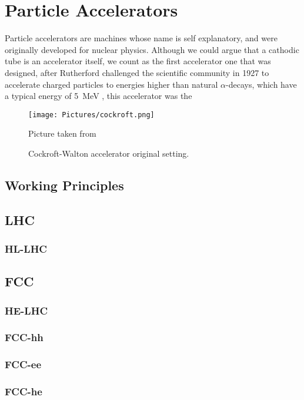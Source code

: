 
\chapter{Particle Accelerators}
\label{c:accel} %
Particle accelerators are machines whose name is self explanatory, and were
originally developed for nuclear physics. Although we could argue that a
cathodic tube is an accelerator itself, we count as the first accelerator one
that was designed, after Rutherford challenged the scientific community in 1927
to accelerate charged particles to energies higher than natural
$\alpha$-decays\cite{Steere2005timeline}, which have a typical energy of
\SI{5}{MeV} , this accelerator was the
\cite{Cockroft619}

\begin{figure}
	\centering
  \begin{minipage}{\textwidth}
  	\centering
   	\texttt{[image: Pictures/cockroft.png]}
  		\caption{\label{fig:cock}
   			Cockroft-Walton accelerator original setting.}
   			\footnotesize{Picture taken from \citep{Cockrofft619}}
   \end{minipage}
\end{figure}

\section{Working Principles}

\section{LHC}
\subsection{HL-LHC}
\section{FCC}
\subsection{HE-LHC}
\subsection{FCC-hh}
\subsection{FCC-ee}
\subsection{FCC-he}
